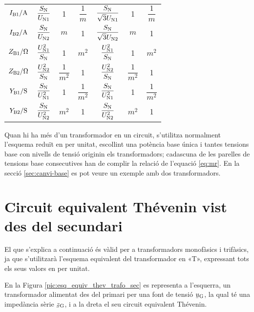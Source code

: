 \begin{ThreePartTable}
\begin{longtable}{ccccccc}
$I\ped{B1}/\si{A}$ & $\dfrac{S\ped{N}}{U\ped{N1}}$ & 1 & $\dfrac{1}{m}$ & $\dfrac{S\ped{N}}{\sqrt{3}U\ped{N1}}$ & 1  & $\dfrac{1}{m}$\\[0.4cm]
$I\ped{B2}/\si{A}$ & $\dfrac{S\ped{N}}{U\ped{N2}}$  & $m$ & 1 & $\dfrac{S\ped{N}}{\sqrt{3}U\ped{N2}}$   & $m$ & 1\\[0.4cm]
$Z\ped{B1}/\si{\ohm}$ & $\dfrac{U\ped{N1}^2}{S\ped{N}}$ & 1 & $m^2$ & $\dfrac{U\ped{N1}^2}{S\ped{N}}$ & 1 & $m^2$\\[0.4cm]
$Z\ped{B2}/\si{\ohm}$ & $\dfrac{U\ped{N2}^2}{S\ped{N}}$  & $\dfrac{1}{m^2}$ & 1& $\dfrac{U\ped{N2}^2}{S\ped{N}}$  & $\dfrac{1}{m^2}$ & 1\\[0.4cm]
$Y\ped{B1}/\si{S}$ & $\dfrac{S\ped{N}}{U\ped{N1}^2}$ & 1 & $\dfrac{1}{m^2}$ & $\dfrac{S\ped{N}}{U\ped{N1}^2}$ & 1 & $\dfrac{1}{m^2}$ \\[0.4cm]
$Y\ped{B2}/\si{S}$ & $\dfrac{S\ped{N}}{U\ped{N2}^2}$  & $m^2$ & 1 & $\dfrac{S\ped{N}}{U\ped{N2}^2}$ &$m^2$ &  1\\[0.4cm]
\bottomrule[1pt]
\end{longtable}
\end{ThreePartTable}


Quan hi ha més d'un transformador en un circuit, s'utilitza normalment l'esquema reduït en per unitat, escollint una potència base única i tantes tensions base con nivells de tensió  originin els transformadors; cadascuna de les parelles de tensions base consecutives han de complir la relació de l'equació \eqref{eq:mr}. En la secció \vref{sec:canvi-base} es pot veure un exemple amb dos transformadors.

\section{Circuit equivalent Thévenin vist des del secundari}\label{sec:trafo-thevenin}

El que s'explica a continuació és vàlid per a transformadors
monofàsics i trifàsics, ja que s'utilitzarà l'esquema equivalent del
transformador en «T», expressant tots els seus valors en per unitat.

En la Figura \vref{pic:esq_equiv_thev_trafo_sec}  es representa a
l'esquerra, un transformador alimentat des del primari per una font
de tensió $\cmplx{u}\ped{G}$, la qual té una impedància sèrie
$\cmplx{z}\ped{G}$, i a  la dreta el seu circuit equivalent
Thévenin.

\begin{center}
    
    \label{pic:esq_equiv_thev_trafo_sec}
\end{center}

